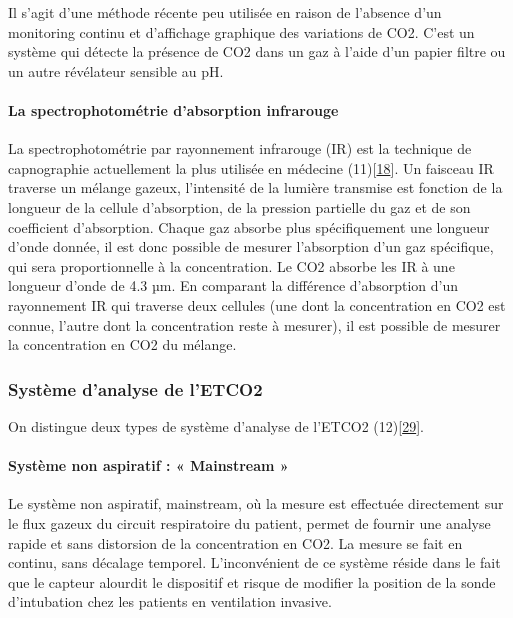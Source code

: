 \documentclass[12pt,]{article}
\let\oldparagraph\paragraph
\renewcommand{\paragraph}[1]{\oldparagraph{#1}\mbox{}}
\begin{document}
Il s'agit d'une méthode récente peu utilisée en raison de l'absence d'un
monitoring continu et d'affichage graphique des variations de CO2. C'est
un système qui détecte la présence de CO2 dans un gaz à l'aide d'un
papier filtre ou un autre révélateur sensible au pH.

\hypertarget{la-spectrophotomuxe9trie-dabsorption-infrarouge}{%
\paragraph{La spectrophotométrie d'absorption
infrarouge}\label{la-spectrophotomuxe9trie-dabsorption-infrarouge}}

La spectrophotométrie par rayonnement infrarouge (IR) est la technique
de capnographie actuellement la plus utilisée en médecine
(11){[}\protect\hyperlink{ref-bhavani1992capnometry}{18}{]}. Un faisceau
IR traverse un mélange gazeux, l'intensité de la lumière transmise est
fonction de la longueur de la cellule d'absorption, de la pression
partielle du gaz et de son coefficient d'absorption. Chaque gaz absorbe
plus spécifiquement une longueur d'onde donnée, il est donc possible de
mesurer l'absorption d'un gaz spécifique, qui sera proportionnelle à la
concentration. Le CO2 absorbe les IR à une longueur d'onde de 4.3 µm. En
comparant la différence d'absorption d'un rayonnement IR qui traverse
deux cellules (une dont la concentration en CO2 est connue, l'autre dont
la concentration reste à mesurer), il est possible de mesurer la
concentration en CO2 du mélange.

\hypertarget{systuxe8me-danalyse-de-letco2}{%
\subsubsection{Système d'analyse de
l'ETCO2}\label{systuxe8me-danalyse-de-letco2}}

On distingue deux types de système d'analyse de l'ETCO2
(12){[}\protect\hyperlink{ref-yosefy2004end}{29}{]}.

\hypertarget{systuxe8me-non-aspiratif-mainstream}{%
\paragraph{Système non aspiratif : « Mainstream
»}\label{systuxe8me-non-aspiratif-mainstream}}

Le système non aspiratif, mainstream, où la mesure est effectuée
directement sur le flux gazeux du circuit respiratoire du patient,
permet de fournir une analyse rapide et sans distorsion de la
concentration en CO2. La mesure se fait en continu, sans décalage
temporel. L'inconvénient de ce système réside dans le fait que le
capteur alourdit le dispositif et risque de modifier la position de la
sonde d'intubation chez les patients en ventilation invasive.
\end{document}
